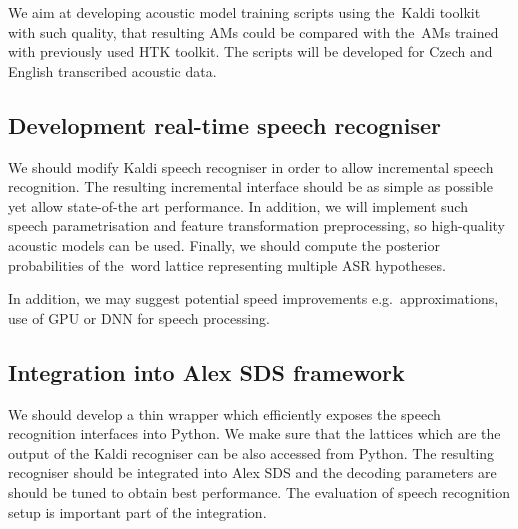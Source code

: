 We aim at developing acoustic model training scripts using the~Kaldi toolkit with such quality, that resulting \acp{AM} could be compared with the~\acp{AM} trained with previously used \ac{HTK} toolkit. 
The scripts will be developed for Czech and English transcribed acoustic data.

\subsection{Development real-time speech recogniser} 
\label{sub:compare_rt}

We should modify Kaldi speech recogniser in order to allow incremental speech recognition.
The resulting incremental interface should be as simple as possible yet allow state-of-the art performance.
In addition, we will implement such speech parametrisation and feature transformation preprocessing, so high-quality acoustic models can be used.
Finally, we should compute the posterior probabilities of the~word lattice representing multiple \ac{ASR} hypotheses.


In addition, we may suggest potential speed improvements e.g.\ approximations, use of \ac{GPU} or \ac{DNN} for speech processing\cite{vesely2013sequencediscriminative}.

\subsection[Integration into Alex \acs{SDS} framework]{Integration into Alex \acl{SDS} framework} 
\label{sub:integration}
We should develop a thin wrapper which efficiently exposes the speech recognition interfaces into Python.
We make sure that the lattices which are the output of the Kaldi recogniser can be also accessed from Python.
The resulting recogniser should be integrated into Alex \ac{SDS} and the decoding parameters are should be tuned to obtain best performance.
The evaluation of speech recognition setup is important part of the integration.


